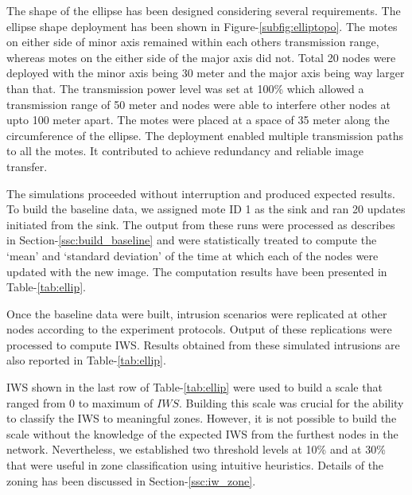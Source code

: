 \documentclass[conference,final]{IEEEtran}
\begin{document}
The shape of the ellipse has been designed considering several requirements.
The ellipse shape deployment has been shown in Figure-\ref{subfig:elliptopo}.
The motes on either side of minor axis remained within each others transmission range, whereas motes on the either side of the major axis did not.
Total 20 nodes were deployed with the minor axis being 30 meter and the major axis being way larger than that.
The transmission power level was set at 100\% which allowed a  transmission range of 50 meter and nodes were  able to interfere other nodes at  upto 100 meter apart.
The motes were placed at a space of 35 meter along the circumference of the ellipse. 
The deployment enabled multiple transmission paths to all the motes.
It contributed to achieve  redundancy and  reliable image transfer. 

The simulations proceeded without interruption and produced expected results.
To build the baseline data, we assigned mote ID 1 as the sink and ran 20 updates initiated from the sink.
The output from these runs were processed as describes in Section-\ref{ssc:build_baseline} and were statistically treated to compute the `mean' and `standard deviation' of the  time at which each of the nodes were updated with the new image.
The computation results have been presented in Table-\ref{tab:ellip}.

Once the baseline data were built, intrusion scenarios were replicated at other nodes according to the experiment protocols.
Output of these replications were processed to compute IWS.
Results obtained from these simulated intrusions are also reported in Table-\ref{tab:ellip}.

IWS shown in the last row of Table-\ref{tab:ellip} were used to build a scale that ranged from $0$ to maximum of $\mathit{IWS}$.
Building this scale was crucial for the ability to classify the IWS to meaningful zones.
However, it is not possible to build the scale without the knowledge of the expected IWS from the furthest nodes in the network.
Nevertheless, we established two threshold levels at 10\% and at 30\% that were useful in zone classification using intuitive heuristics.
Details of the zoning has been discussed in Section-\ref{ssc:iw_zone}.
\end{document}
